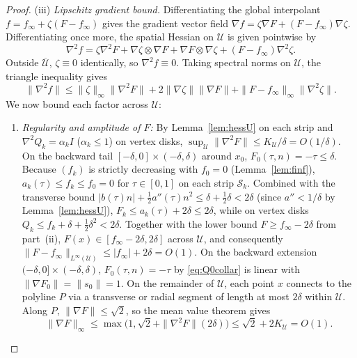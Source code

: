 \documentclass[10pt,a4paper]{amsart}
\begin{document}
\begin{proof}
(iii) \emph{Lipschitz gradient bound.}
Differentiating the global interpolant $f = f_\infty + \zeta(F - f_\infty)$ gives the gradient vector field $\nabla f = \zeta \nabla F + (F - f_\infty)\nabla\zeta$.
Differentiating once more, the spatial Hessian on $\mathcal U$ is given pointwise by
\begin{equation}
\label{eq:hess-pointwise}
\nabla^2 f = \zeta \nabla^2 F + \nabla\zeta \otimes \nabla F + \nabla F \otimes \nabla\zeta + (F - f_\infty)\nabla^2\zeta.
\end{equation}
Outside $\overline{\mathcal U}$, $\zeta \equiv 0$ identically, so $\nabla^2 f \equiv 0$.
Taking spectral norms on $\mathcal U$, the triangle inequality gives
\begin{equation}
\label{eq:hess-norm-bound}
\|\nabla^2 f\| \le \|\zeta\|_\infty \|\nabla^2 F\| + 2\|\nabla\zeta\|\|\nabla F\| + \|F - f_\infty\|_\infty \|\nabla^2\zeta\|.
\end{equation}
We now bound each factor across $\mathcal U$:
\begin{enumerate}
\item \emph{Regularity and amplitude of $F$:}
By Lemma~\ref{lem:hessU} on each strip and $\nabla^2 Q_k = \alpha_k I$ ($\alpha_k \le 1$) on vertex disks, $\sup_{\mathcal U}\|\nabla^2 F\| \le K_{\mathcal U}/\delta = O(1/\delta)$.
On the backward tail $[-\delta, 0] \times (-\delta, \delta)$ around $x_0$, $F_0(\tau, n) = -\tau \le \delta$.
Because $(f_k)$ is strictly decreasing with $f_0 = 0$ (Lemma~\ref{lem:finf}), $a_k(\tau) \le f_k \le f_0 = 0$ for $\tau \in [0, 1]$ on each strip $\mathcal S_k$.
Combined with the transverse bound $|b(\tau)n| + \frac12 a''(\tau)n^2 \le \delta + \frac12\delta < 2\delta$ (since $a'' < 1/\delta$ by Lemma~\ref{lem:hessU}), $F_k \le a_k(\tau) + 2\delta \le 2\delta$, while on vertex disks $Q_k \le f_k + \delta + \frac12\delta^2 < 2\delta$.
Together with the lower bound $F \ge f_\infty - 2\delta$ from part~(ii), $F(x) \in [f_\infty - 2\delta, 2\delta]$ across $\mathcal U$, and consequently $\|F - f_\infty\|_{L^\infty(\mathcal U)} \le |f_\infty| + 2\delta = O(1)$.
On the backward extension $(-\delta, 0] \times (-\delta, \delta)$, $F_0(\tau, n) = -\tau$ by \eqref{eq:Q0collar} is linear with $\|\nabla F_0\| = \|s_0\| = 1$.
On the remainder of $\mathcal U$, each point $x$ connects to the polyline $P$ via a transverse or radial segment of length at most $2\delta$ within $\mathcal U$.
Along $P$, $\|\nabla F\| \le \sqrt2$, so the mean value theorem gives
\[
\|\nabla F\|_\infty \le \max\bigl(1, \sqrt2 + \|\nabla^2 F\|(2\delta)\bigr) \le \sqrt2 + 2K_{\mathcal U} = O(1).
\]


\end{enumerate}
\end{proof}
\end{document}
